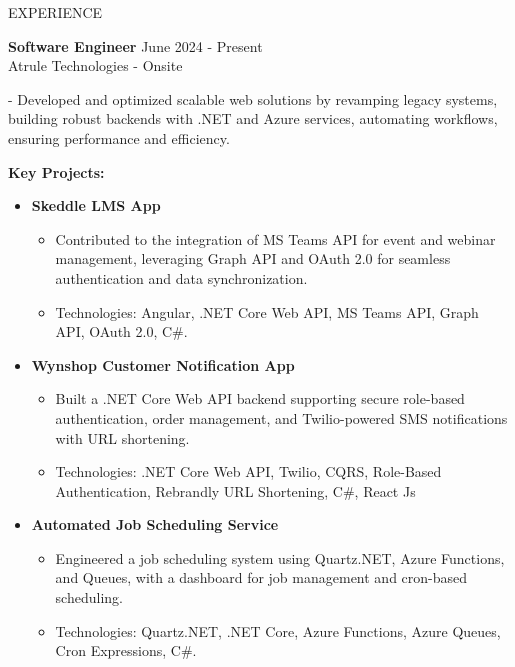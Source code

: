 \documentclass{resume} %
\begin{document}


\begin{rSection}{EXPERIENCE}
	
	\textbf{Software Engineer} \hfill June 2024 - Present\\
	Atrule Technologies - Onsite %
		\itemsep 1pt {} 
				
		\item - Developed and optimized scalable web solutions by revamping legacy systems, building robust backends with .NET and Azure services, automating workflows, ensuring performance and efficiency.
		
		
		\textbf{Key Projects:}
		\begin{itemize}
			\itemsep -5pt {} 
			\item \textbf {Skeddle LMS App} 
			\begin{itemize}
				\itemsep -5pt {} 
				\item Contributed to the integration of MS Teams API for event and webinar management, leveraging Graph API and OAuth 2.0 for seamless authentication and data synchronization.
				\item Technologies: Angular, .NET Core Web API, MS Teams API, Graph API, OAuth 2.0, C\#.
			\end{itemize}
			\item \textbf {Wynshop Customer Notification App} 
			\begin{itemize}
				\itemsep -5pt {} 
				\item Built a .NET Core Web API backend supporting secure role-based authentication, order management, and Twilio-powered SMS notifications with URL shortening.
				\item Technologies: .NET Core Web API, Twilio, CQRS, Role-Based Authentication, Rebrandly URL Shortening, C\#, React Js
			\end{itemize}
			\item \textbf {Automated Job Scheduling Service} 
			\begin{itemize}
				\itemsep -5pt {} 
				\item Engineered a job scheduling system using Quartz.NET, Azure Functions, and Queues, with a dashboard for job management and cron-based scheduling.			
				\item Technologies: Quartz.NET, .NET Core, Azure Functions, Azure Queues, Cron Expressions, C\#.  \\ \\ \\ \\
			\end{itemize}
		\end{itemize}
		

\end{rSection}
\end{document}
